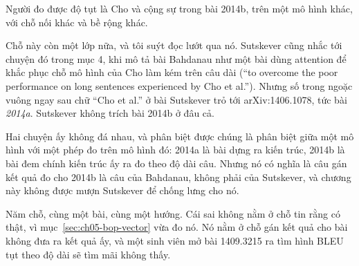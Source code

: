 Người đo được độ tụt là Cho và cộng sự trong bài 2014b, trên một mô hình khác,
với chỗ nối khác và bề rộng khác.

Chỗ này còn một lớp nữa, và tôi suýt đọc lướt qua nó. Sutskever cũng nhắc tới
chuyện đó trong mục 4, khi mô tả bài Bahdanau như một bài dùng attention để
khắc phục chỗ mô hình của Cho làm kém trên câu dài (\enquote{to overcome the
poor performance on long sentences experienced by Cho et al.}). Nhưng số trong
ngoặc vuông ngay sau chữ \enquote{Cho et al.} ở bài Sutskever trỏ tới
arXiv:1406.1078, tức bài \emph{2014a}. Sutskever không trích bài 2014b ở đâu
cả.

Hai chuyện ấy không đá nhau, và phân biệt được chúng là phân biệt giữa một mô
hình với một phép đo trên mô hình đó: 2014a là bài dựng ra kiến trúc, 2014b là
bài đem chính kiến trúc ấy ra đo theo độ dài câu. Nhưng nó có nghĩa là câu gán
kết quả đo cho 2014b là câu của Bahdanau, không phải của Sutskever, và chương
này không được mượn Sutskever để chống lưng cho nó.

Năm chỗ, cùng một bài, cùng một hướng. Cái sai không nằm ở chỗ tin rằng
có thật, vì mục~\ref{sec:ch05-bop-vector} vừa đo nó. Nó nằm ở chỗ gán kết quả
cho bài không đưa ra kết quả ấy, và một sinh viên mở bài 1409.3215 ra tìm hình
BLEU tụt theo độ dài sẽ tìm mãi không thấy.
